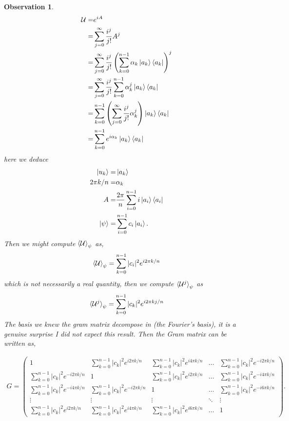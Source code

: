 \documentclass[12pt,letterpaper]{article}
\newtheorem{observation}{Observation}
\begin{document}
\begin{multicols}{2}
\begin{observation}
\begin{align}
\mathcal{U}=&e^{iA}\\
=&\sum_{j=0}^{\infty}\frac{i^j}{j!}A^j\\
=&\sum_{j=0}^{\infty}\frac{i^j}{j!}\left(\sum_{k=0}^{n-1}\alpha_k\ket{a_k}\bra{a_k}\right)^j\\
=&\sum_{j=0}^{\infty}\frac{i^j}{j!}\sum_{k=0}^{n-1}\alpha_k^j\ket{a_k}\bra{a_k}\\
=&\sum_{k=0}^{n-1}\left(\sum_{j=0}^{\infty}\frac{i^j}{j!}\alpha_k^j\right)\ket{a_k}\bra{a_k}\\
=&\sum_{k=0}^{n-1}e^{i\alpha_k}\ket{a_k}\bra{a_k}
\end{align}
here we deduce 
\begin{align}
\ket{u_k}=&\ket{a_k}\\
2\pi k/n =& \alpha_k\\
A=&\frac{2\pi}{n}\sum_{i=0}^{n-1}i \ket{a_i}\bra{a_i}\\
\ket{\psi}=&\sum_{i=0}^{n-1}c_i\ket{a_i}.
\end{align}
Then we might compute $\braket{\mathcal{U}}_\psi$ as,
\begin{align}
\braket{\mathcal{U}}_\psi= \sum_{k=0}^{n-1}|c_i|^2e^{i2\pi k/n}
\end{align}
which is not necessarily a real quantity, then we compute $\braket{\mathcal{U}^j}_\psi$ as
\begin{align}
\braket{\mathcal{U}^j}_\psi= \sum_{k=0}^{n-1}|c_k|^2e^{i2\pi kj/n}
\end{align}
The basis we knew the gram matrix decompose in  (the Fourier's basis), it is a genuine surprise I did not expect this result. Then the Gram matrix can be written as,
\end{observation}
\end{multicols}
\begin{align}
G=\begin{pmatrix}
 1 & \sum_{k=0}^{n-1}|c_k|^2e^{i2\pi k/n} & \sum_{k=0}^{n-1}|c_k|^2e^{i4\pi k/n}  & \hdots &  \sum_{k=0}^{n-1}|c_k|^2e^{-i2\pi k/n} \\
  \sum_{k=0}^{n-1}|c_k|^2e^{-i2\pi k/n} & 1 & \sum_{k=0}^{n-1}|c_k|^2e^{i2\pi k/n} & \hdots & \sum_{k=0}^{n-1}|c_k|^2e^{-i4\pi k/n} \\
   \sum_{k=0}^{n-1}|c_k|^2e^{-i4\pi k/n} &  \sum_{k=0}^{n-1}|c_k|^2e^{-i2\pi k/n}  & 1 & \hdots & \sum_{k=0}^{n-1}|c_k|^2e^{-i6\pi k/n} \\
   \vdots & \vdots & \vdots & \ddots & \vdots \\
  \sum_{k=0}^{n-1}|c_k|^2e^{i2\pi k/n} &\sum_{k=0}^{n-1}|c_k|^2e^{i4\pi k/n}  & \sum_{k=0}^{n-1}|c_k|^2e^{i6\pi k/n}  & \hdots &  1 
\end{pmatrix}.
\end{align}
\end{document}

